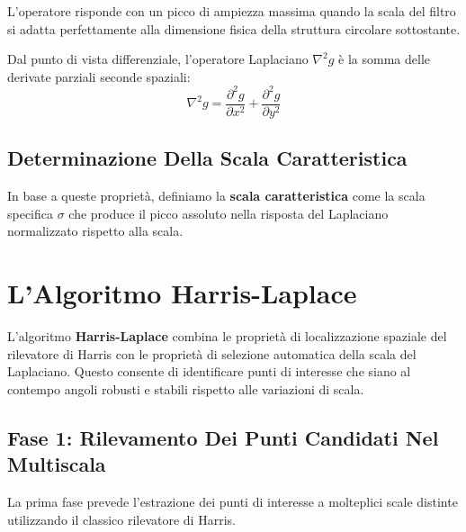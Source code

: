 ﻿\documentclass[11pt, a4paper]{article}
\begin{document}

L'operatore risponde con un picco di ampiezza massima quando la scala del filtro si adatta perfettamente alla dimensione fisica della struttura circolare sottostante.


Dal punto di vista differenziale, l'operatore Laplaciano $\nabla^2 g$ è la somma delle derivate parziali seconde spaziali:
\[ \nabla^2 g = \frac{\partial^2 g}{\partial x^2} + \frac{\partial^2 g}{\partial y^2} \]

\subsection{Determinazione Della Scala Caratteristica}

In base a queste proprietà, definiamo la \textbf{scala caratteristica} come la scala specifica $\sigma$ che produce il picco assoluto nella risposta del Laplaciano normalizzato rispetto alla scala.


\newpage

\section{L'Algoritmo Harris-Laplace}

L'algoritmo \textbf{Harris-Laplace} combina le proprietà di localizzazione spaziale del rilevatore di Harris con le proprietà di selezione automatica della scala del Laplaciano. Questo consente di identificare punti di interesse che siano al contempo angoli robusti e stabili rispetto alle variazioni di scala.

\subsection{Fase 1: Rilevamento Dei Punti Candidati Nel Multiscala}

La prima fase prevede l'estrazione dei punti di interesse a molteplici scale distinte utilizzando il classico rilevatore di Harris.
\end{document}
